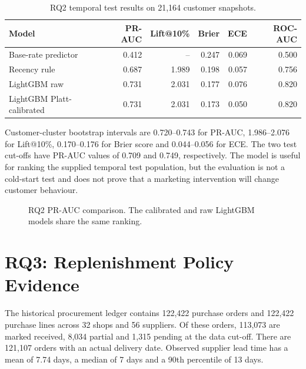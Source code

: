 \begin{table}[htbp]
\centering
\small
\begin{tabular}{lrrrrr}
\toprule
\textbf{Model} & \textbf{PR-AUC} & \textbf{Lift@10\%} & \textbf{Brier} & \textbf{ECE} & \textbf{ROC-AUC}\\
\midrule
Base-rate predictor & 0.412 & -- & 0.247 & 0.069 & 0.500\\
Recency rule & 0.687 & 1.989 & 0.198 & 0.057 & 0.756\\
LightGBM raw & 0.731 & 2.031 & 0.177 & 0.076 & 0.820\\
LightGBM Platt-calibrated & 0.731 & 2.031 & 0.173 & 0.050 & 0.820\\
\bottomrule
\end{tabular}
\caption{RQ2 temporal test results on 21,164 customer snapshots.}
\label{tab:rq2_metrics}
\end{table}

Customer-cluster bootstrap intervals are 0.720--0.743 for PR-AUC, 1.986--2.076 for Lift@10\%, 0.170--0.176 for Brier score and 0.044--0.056 for ECE. The two test cut-offs have PR-AUC values of 0.709 and 0.749, respectively. The model is useful for ranking the supplied temporal test population, but the evaluation is not a cold-start test and does not prove that a marketing intervention will change customer behaviour.

\begin{figure}[htbp]
\centering
{}
\caption{RQ2 PR-AUC comparison. The calibrated and raw LightGBM models share the same ranking.}
\label{fig:rq2_prauc}
\end{figure}

\section{RQ3: Replenishment Policy Evidence}
The historical procurement ledger contains 122,422 purchase orders and 122,422 purchase lines across 32 shops and 56 suppliers. Of these orders, 113,073 are marked received, 8,034 partial and 1,315 pending at the data cut-off. There are 121,107 orders with an actual delivery date. Observed supplier lead time has a mean of 7.74 days, a median of 7 days and a 90th percentile of 13 days.

